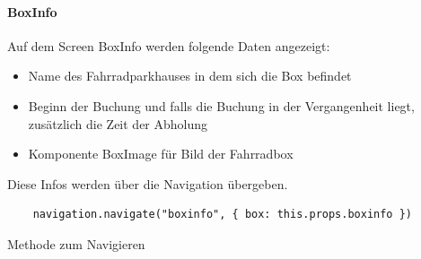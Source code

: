 \paragraph{BoxInfo}
Auf dem Screen BoxInfo werden folgende Daten angezeigt:\\
\begin{itemize}
  \item Name des Fahrradparkhauses in dem sich die Box befindet
  \item Beginn der Buchung und falls die Buchung in der Vergangenheit liegt, zusätzlich die Zeit der Abholung
  \item Komponente BoxImage für Bild der Fahrradbox
\end{itemize}
Diese Infos werden über die Navigation übergeben.\\
\begin{listing}[H]
  \begin{verbatim}
    navigation.navigate("boxinfo", { box: this.props.boxinfo })
\end{verbatim}
  \caption{Methode zum Navigieren}
  \label{lst:navigation}
\end{listing}

